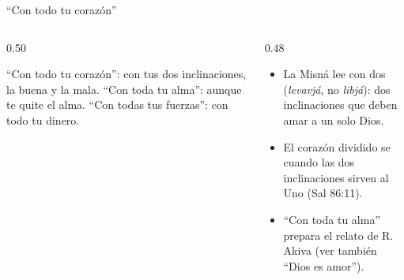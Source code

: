 \begin{frame}{``Con todo tu corazón''}
\begin{columns}[t,onlytextwidth]
\begin{column}{0.50\textwidth}
\begin{cita}[colback=dorado!10!papiro,colframe=dorado!80!azul,fontupper=\scriptsize\itshape]``Con todo tu corazón'': con tus dos inclinaciones, la buena y la mala. ``Con toda tu alma'': aunque te quite el alma. ``Con todas tus fuerzas'': con todo tu dinero.\end{cita}
\begin{center}\scriptsize{}\end{center}
\end{column}
\begin{column}{0.48\textwidth}\small
\begin{itemize}
\item La Misná lee  con dos  (\emph{levavjá}, no \emph{libjá}): dos inclinaciones que deben amar a un solo Dios.
\item El corazón dividido se  cuando las dos inclinaciones sirven al Uno (Sal 86:11).
\item ``Con toda tu alma'' prepara el relato de R. Akiva (ver también ``Dios es amor'').
\end{itemize}
\end{column}
\end{columns}
\end{frame}

